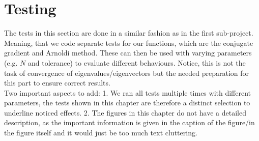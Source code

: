 \documentclass[11pt, letterpaper, onecolumn]{article}
\begin{document}
	
	
	\section{Testing}
	The tests in this section are done in a similar fashion as in the first sub-project. Meaning, that we code separate tests for our functions, which are the conjugate gradient and Arnoldi method. These can then be used with varying parameters (e.g. $N$ and tolerance) to evaluate different behaviours. Notice, this is not the task of convergence of eigenvalues/eigenvectors but the needed preparation for this part to ensure correct results. \\
	Two important aspects to add: 1. We ran all tests multiple times with different parameters, the tests shown in this chapter are therefore a distinct selection to underline noticed effects. 2. The figures in this chapter do not have a detailed description, as the important information is given in the caption of the figure/in the figure itself and it would just be too much text cluttering.
\end{document}
